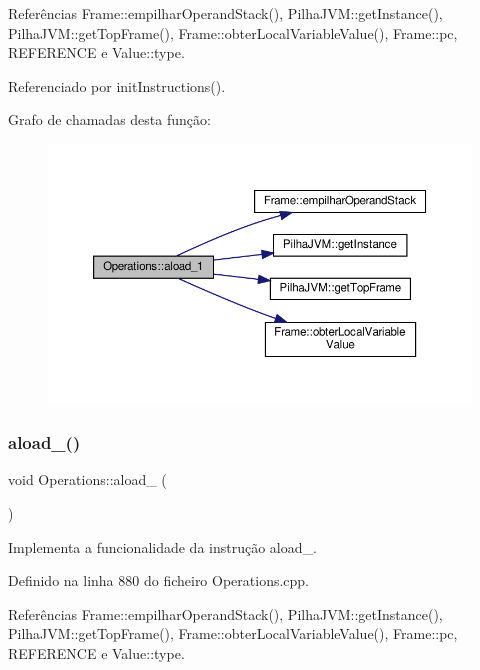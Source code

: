Referências Frame\+::empilhar\+Operand\+Stack(), Pilha\+J\+V\+M\+::get\+Instance(), Pilha\+J\+V\+M\+::get\+Top\+Frame(), Frame\+::obter\+Local\+Variable\+Value(), Frame\+::pc, R\+E\+F\+E\+R\+E\+N\+CE e Value\+::type.



Referenciado por init\+Instructions().

Grafo de chamadas desta função\+:\nopagebreak
\begin{figure}[H]
\begin{center}
\leavevmode
\includegraphics[width=350pt]{classOperations_a8291f2b716c1be7428d9b63a5225b52d_cgraph}
\end{center}
\end{figure}
\mbox{\label{classOperations_abd58f463152d7f88b9fb2f133c6ca184}} 
\subsubsection{\texorpdfstring{aload\+\_()}{aload\_2()}}
{\footnotesize\ttfamily void Operations\+::aload\+\_ (\begin{DoxyParamCaption}{ }\end{DoxyParamCaption})\hspace{0.3cm}{\ttfamily [private]}}



Implementa a funcionalidade da instrução aload\+\_. 



Definido na linha 880 do ficheiro Operations.\+cpp.



Referências Frame\+::empilhar\+Operand\+Stack(), Pilha\+J\+V\+M\+::get\+Instance(), Pilha\+J\+V\+M\+::get\+Top\+Frame(), Frame\+::obter\+Local\+Variable\+Value(), Frame\+::pc, R\+E\+F\+E\+R\+E\+N\+CE e Value\+::type.



